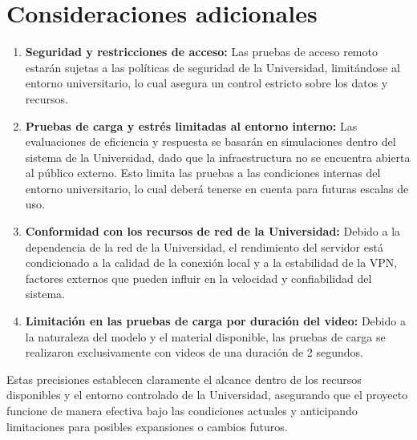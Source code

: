 \section{Consideraciones adicionales}

\begin{enumerate}
    \item \textbf{Seguridad y restricciones de acceso:} Las pruebas de acceso remoto estarán sujetas a las políticas de seguridad de la Universidad, limitándose al entorno universitario, lo cual asegura un control estricto sobre los datos y recursos.
  
    \item \textbf{Pruebas de carga y estrés limitadas al entorno interno:} Las evaluaciones de eficiencia y respuesta se basarán en simulaciones dentro del sistema de la Universidad, dado que la infraestructura no se encuentra abierta al público externo. Esto limita las pruebas a las condiciones internas del entorno universitario, lo cual deberá tenerse en cuenta para futuras escalas de uso.
  
    \item \textbf{Conformidad con los recursos de red de la Universidad:} Debido a la dependencia de la red de la Universidad, el rendimiento del servidor está condicionado a la calidad de la conexión local y a la estabilidad de la VPN, factores externos que pueden influir en la velocidad y confiabilidad del sistema.
  
    \item \textbf{Limitación en las pruebas de carga por duración del video:} Debido a la naturaleza del modelo y el material disponible, las pruebas de carga se realizaron exclusivamente con videos de una duración de 2 segundos.
\end{enumerate}

Estas precisiones establecen claramente el alcance dentro de los recursos disponibles y el entorno controlado de la Universidad, asegurando que el proyecto funcione de manera efectiva bajo las condiciones actuales y anticipando limitaciones para posibles expansiones o cambios futuros.

